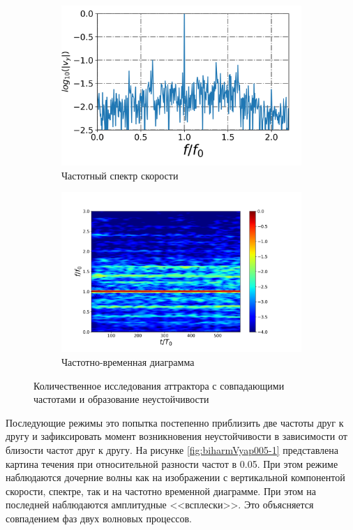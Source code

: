 \begin{figure}
\begin{subfigure}[с]{0.45\textwidth}
	    \includegraphics[width=1\textwidth]{pics/H40L60N1ap10dp20w0p63/spectrumX35p6Y11p2n4000.png}
	    \caption{Частотный спектр скорости}
	\end{subfigure}
	\begin{subfigure}[с]{0.45\textwidth}
	    \includegraphics[width=1\textwidth]{pics/H40L60N1ap10dp20w0p63/TFspectrumX35p6Y11p2N1024.png}
	    \caption{Частотно-временная диаграмма}
	\end{subfigure}
	\label{fig:Vyamp1-1}
	\caption{Количественное исследования аттрактора с совпадающими частотами и образование неустойчивости}
	\label{fig:Vyamp1}
\end{figure}

Последующие режимы это попытка постепенно приблизить две частоты друг к другу и зафиксировать момент возникновения неустойчивости в зависимости от близости частот друг к другу. На рисунке \ref{fig:biharmVyap005-1} представлена картина течения при относительной разности частот в 0.05. При этом режиме наблюдаются дочерние волны как на изображении с вертикальной компонентой скорости, спектре, так и на частотно временной диаграмме. При этом на последней наблюдаются  амплитудные <<всплески>>. Это объясняется совпадением фаз двух волновых процессов.

